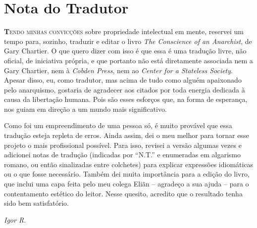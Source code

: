
\chapter{Nota do Tradutor}

\lettrine[lines=2]{\textcolor{LettrineColor}{\textbf{T}}}{endo minhas convicções} sobre propriedade intelectual em mente, reservei um tempo para, sozinho, traduzir e editar o livro \emph{The Conscience of an Anarchist}, de Gary Chartier. O que quero dizer com isso é que essa é uma tradução livre, não oficial, de iniciativa própria, e que portanto não está diretamente associada nem a Gary Chartier, nem à \emph{Cobden Press}, nem ao \emph{Center for a Stateless Society}. Apesar disso, eu, como tradutor, mas acima de tudo como alguém apaixonado pelo anarquismo, gostaria de agradecer aos citados por toda energia dedicada à causa da libertação humana. Pois são esses esforços que, na forma de esperança, nos guiam em direção a um mundo mais significativo.

Como foi um empreendimento de uma pessoa só, é muito provável que essa tradução esteja repleta de erros. Ainda assim, dei o meu melhor para tornar esse projeto o mais profissional possível. Para isso, revisei a versão algumas vezes e adicionei notas de tradução (indicadas por ``N.T.'' e enumeradas em algarismo romano, ou então sinalizadas entre colchetes) para explicar expressões idiomáticas ou o que fosse necessário. Também dei muita importância para a edição do livro, que inclui uma capa feita pelo meu colega Eliãn -- agradeço a sua ajuda -- para o contentamento estético do leitor. Nesse quesito, acredito que o resultado tenha sido bem satisfatório.

\begin{flushright}
\large\emph{Igor R.}
\end{flushright}
